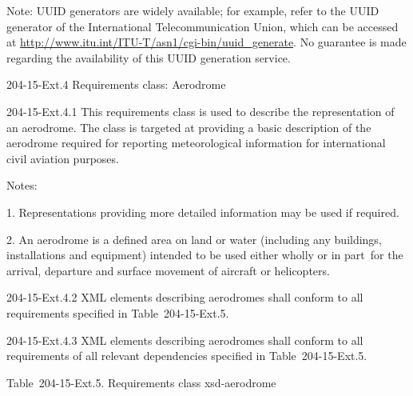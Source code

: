 Note: UUID generators are widely available; for example, refer to the UUID generator of the International Telecommunication Union, which can be accessed at \url{http://www.itu.int/ITU-T/asn1/cgi-bin/uuid_generate}. No guarantee is made regarding the availability of this UUID generation service.

204-15-Ext.4 Requirements class: Aerodrome

204-15-Ext.4.1 This requirements class is used to describe the representation of an aerodrome. The class is targeted at providing a basic description of the aerodrome required for reporting meteorological information for international civil aviation purposes.

Notes:

1. Representations providing more detailed information may be used if required.

2. An aerodrome is a defined area on land or water (including any buildings, installations and equipment) intended to be used either wholly or in part~for the arrival, departure and surface movement of aircraft or helicopters.

204-15-Ext.4.2 XML elements describing aerodromes shall conform to all requirements specified in Table~204-15-Ext.5.

204-15-Ext.4.3 XML elements describing aerodromes shall conform to all requirements of all relevant dependencies specified in Table~204-15-Ext.5.

Table~204-15-Ext.5. Requirements class xsd-aerodrome

